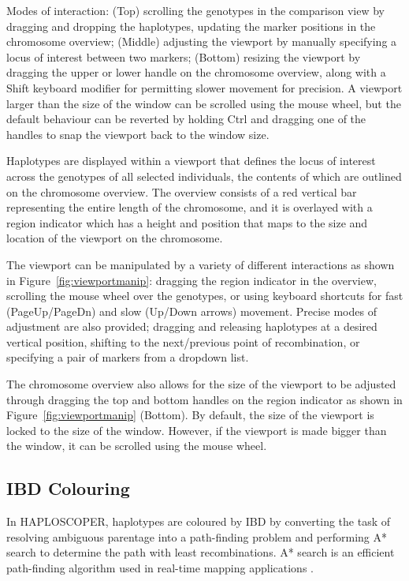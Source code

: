 \documentclass{assets/biotemplate/bioinfo}
\numberwithin{equation}{section}
\def\haplo{{HAPLOSCOPER}}            %
\begin{document}
	{Modes of interaction: (Top) scrolling the genotypes in the comparison view by dragging and dropping the haplotypes, updating the marker positions in the chromosome overview; (Middle) adjusting the viewport by manually specifying a locus of interest between two markers; (Bottom) resizing the viewport by dragging the upper or lower handle on the chromosome overview, along with a Shift keyboard modifier for permitting slower movement for precision. A viewport larger than the size of the window can be scrolled using the mouse wheel, but the default behaviour can be reverted by holding Ctrl and dragging one of the handles to snap the viewport back to the window size.}

Haplotypes are displayed within a viewport that defines the locus of interest across the genotypes of all selected individuals, the contents of which are outlined on the chromosome overview. The overview consists of a red vertical bar representing the entire length of the chromosome, and it is overlayed with a region indicator which has a height and position that maps to the size and location of the viewport on the chromosome.

The viewport can be manipulated by a variety of different interactions as shown in Figure~\ref{fig:viewportmanip}: dragging the region indicator in the overview, scrolling the mouse wheel over the genotypes, or using keyboard shortcuts for fast (PageUp/PageDn) and slow (Up/Down arrows) movement. Precise modes of adjustment are also provided; dragging and releasing haplotypes at a desired vertical position, shifting to the next/previous point of recombination, or specifying a pair of markers from a dropdown list.

The chromosome overview also allows for the size of the viewport to be adjusted through dragging the top and bottom handles on the region indicator as shown in Figure~\ref{fig:viewportmanip} (Bottom). By default, the size of the viewport is locked to the size of the window. However, if the viewport is made bigger than the window, it can be scrolled using the mouse wheel.

\subsection{IBD Colouring}

In \haplo{}, haplotypes are coloured by IBD by converting the task of resolving ambiguous parentage into a path-finding problem and performing A* search to determine the path with least recombinations. A* search is an efficient path-finding algorithm used in real-time mapping applications \citep{algfoor2015comprehensive}.
\end{document}

